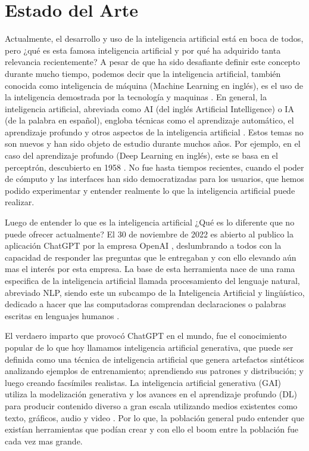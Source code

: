 
\chapter{Estado del Arte}


\par Actualmente, el desarrollo y uso de la inteligencia artificial está en boca de todos, pero ¿qué es esta famosa 
inteligencia artificial y por qué ha adquirido tanta relevancia recientemente? A pesar de que ha sido desafiante
definir este concepto durante mucho tiempo, podemos decir que la inteligencia artificial, también conocida 
como inteligencia de máquina (Machine Learning en inglés), es el uso de la inteligencia demostrada por la 
tecnología y maquinas \cite{mt1}. En general, la inteligencia artificial, abreviada como AI (del inglés Artificial Intelligence) 
o IA (de la palabra en español), engloba técnicas como el aprendizaje automático, el aprendizaje profundo y
otros aspectos de la inteligencia artificial \cite{mt1}. Estos temas no son nuevos y han sido objeto de estudio durante 
muchos años. Por ejemplo, en el caso del aprendizaje profundo (Deep Learning en inglés), este se basa en el 
perceptrón, descubierto en 1958 \cite{perceptron}. No fue hasta tiempos recientes, cuando el poder de cómputo y las interfaces 
han sido democratizadas para los usuarios, que hemos podido experimentar y entender realmente lo que la 
inteligencia artificial puede realizar.


\par Luego de entender lo que es la inteligencia artificial ¿Qué es lo diferente que no puede ofrecer actualmente? 
El 30 de noviembre de 2022 es abierto al publico la aplicación ChatGPT por la empresa OpenAI \cite{mt3}, deslumbrando a todos 
con la capacidad de responder las preguntas que le entregaban y con ello elevando aún mas el interés por esta empresa.
La base de esta herramienta nace de una rama especifica de la inteligencia artificial llamada procesamiento del lenguaje 
natural, abreviado NLP, siendo este un subcampo de la Inteligencia Artificial y lingüístico, dedicado a hacer que las 
computadoras comprendan declaraciones o palabras escritas en lenguajes humanos \cite{nlpeda}.


\par El verdaero imparto que provocó ChatGPT en el mundo, fue el conocimiento popular de lo que hoy llamamos inteligencia 
artificial generativa, que puede ser definida como una técnica de inteligencia artificial que genera artefactos sintéticos analizando 
ejemplos de entrenamiento; aprendiendo sus patrones y distribución; y luego creando facsímiles realistas. La inteligencia 
artificial generativa (GAI) utiliza la modelización generativa y los avances en el aprendizaje profundo (DL) para producir 
contenido diverso a gran escala utilizando medios existentes como texto, gráficos, audio y video \cite{mt2}. Por lo que, la población 
general pudo entender que existían herramientas que podían crear y con ello el boom entre la población fue cada vez mas grande. 

